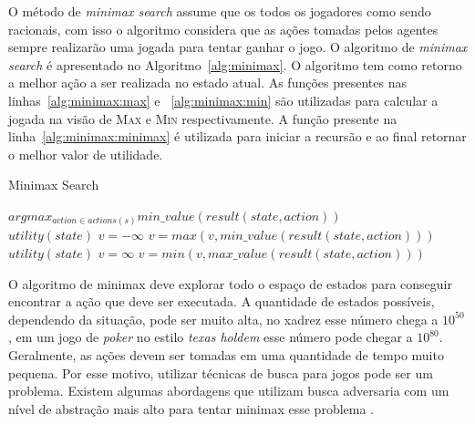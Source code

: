 O método de \textit{minimax search} assume que os todos os jogadores como sendo racionais, com isso o algoritmo considera que as ações tomadas pelos agentes sempre realizarão uma jogada para tentar ganhar o jogo. O algoritmo de \textit{minimax search} é apresentado no Algoritmo~\ref{alg:minimax}. O algoritmo tem como retorno a melhor ação a ser realizada no estado atual. As funções presentes nas linhas~\ref{alg:minimax:max} e ~\ref{alg:minimax:min} são utilizadas para calcular a jogada na visão de \textsc{Max} e \textsc{Min} respectivamente.
A função presente na linha~\ref{alg:minimax:minimax} é utilizada para iniciar a recursão e ao final retornar o melhor valor de utilidade.

\begin{algorithm}
	\caption{Minimax Search}
	\label{alg:minimax}
	\begin{algorithmic}[1]	
		 \label{alg:minimax:minimax}
		\State \Return $arg max_{action \in actions(s)} min\_value(result(state, action)) $
		\EndFunction \\
		\label{alg:minimax:max}
		\State	\Return $utility(state)$
		\EndIf
		\State $v = -\infty$
		\State $v = max(v, min\_value(result(state,action)))$
		\EndFor	
		\EndFunction \\
		\label{alg:minimax:min}
		\State	\Return $utility(state)$
		\EndIf
		\State $v = \infty$
		\State $v = min(v, max\_value(result(state,action)))$
		\EndFor	
		\EndFunction
	\end{algorithmic}
\end{algorithm}

O algoritmo de minimax deve explorar todo o espaço de estados para conseguir encontrar a ação que deve ser executada. A quantidade de estados possíveis, dependendo da situação, pode ser muito alta, no xadrez esse número chega a $10^{50}$, em um jogo de \textit{poker} no estilo \textit{texas holdem} esse número pode chegar a $10^{80}$. Geralmente, as ações devem ser tomadas em uma quantidade de tempo muito pequena. Por esse motivo, utilizar técnicas de busca para jogos pode ser um problema. Existem algumas abordagens que utilizam busca adversaria com um nível de abstração mais alto para tentar minimax esse problema \cite{ontanon2013survey}.  

